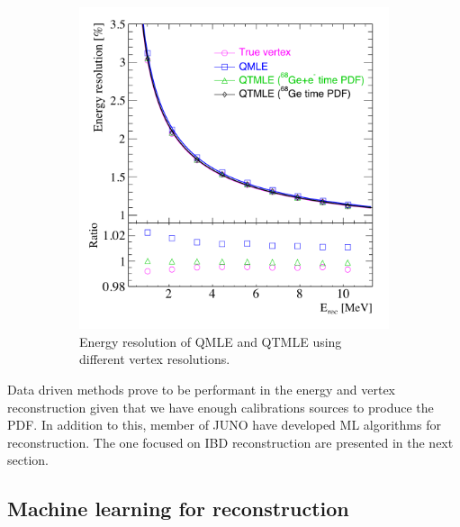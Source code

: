 \documentclass[../main.tex]{subfiles}
\begin{document}
\begin{figure}[ht]
\begin{subfigure}{0.48\linewidth}
    \includegraphics[width=\textwidth]{images/juno/reco/energy_qtmle.png}
    \caption{Energy resolution of QMLE and QTMLE using different vertex resolutions.}
  \end{subfigure}
  \caption{}
  \label{fig:juno:rec:qtmle}
\end{figure}

Data driven methods prove to be performant in the energy and vertex reconstruction given that we have enough calibrations sources to produce the PDF. In addition to this, member of JUNO have developed ML algorithms for reconstruction. The one focused on IBD reconstruction are presented in the next section.

\subsection{Machine learning for reconstruction}
\label{sec:juno:ml}
\end{document}
